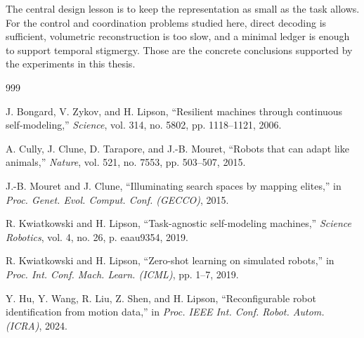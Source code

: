 \documentclass[12pt,a4paper,oneside]{report}
\begin{document}
The central design lesson is to keep the representation as small as the task allows. For the control and coordination problems studied here, direct decoding is sufficient, volumetric reconstruction is too slow, and a minimal ledger is enough to support temporal stigmergy. Those are the concrete conclusions supported by the experiments in this thesis.



\begin{thebibliography}{999}





J. Bongard, V. Zykov, and H. Lipson, ``Resilient machines through continuous self-modeling,'' \textit{Science}, vol. 314, no. 5802, pp. 1118--1121, 2006.




A. Cully, J. Clune, D. Tarapore, and J.-B. Mouret, ``Robots that can adapt like animals,'' \textit{Nature}, vol. 521, no. 7553, pp. 503--507, 2015.




J.-B. Mouret and J. Clune, ``Illuminating search spaces by mapping elites,'' in \textit{Proc. Genet. Evol. Comput. Conf. (GECCO)}, 2015.




R. Kwiatkowski and H. Lipson, ``Task-agnostic self-modeling machines,'' \textit{Science Robotics}, vol. 4, no. 26, p. eaau9354, 2019.




R. Kwiatkowski and H. Lipson, ``Zero-shot learning on simulated robots,'' in \textit{Proc. Int. Conf. Mach. Learn. (ICML)}, pp. 1--7, 2019.




Y. Hu, Y. Wang, R. Liu, Z. Shen, and H. Lipson, ``Reconfigurable robot identification from motion data,'' in \textit{Proc. IEEE Int. Conf. Robot. Autom. (ICRA)}, 2024.




\end{thebibliography}
\end{document}
